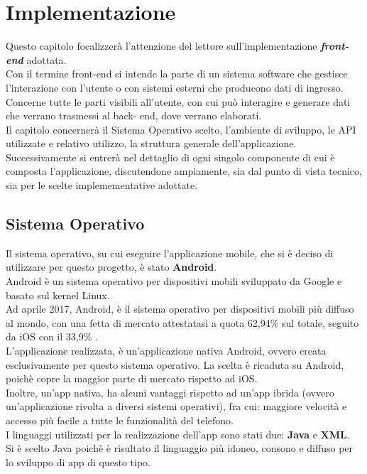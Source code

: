 \chapter{Implementazione}
\label{chapter2}

Questo capitolo focalizzerà l'attenzione del lettore sull'implementazione \textit{\textbf{front-end}} adottata.
\\Con il termine front-end si intende la parte di un sistema software che gestisce l’interazione con l’utente o con sistemi esterni che producono dati di ingresso. Concerne tutte le parti visibili all’utente, con cui può interagire e generare dati che verrano trasmessi al back- end, dove verrano elaborati.
\\Il capitolo concernerà il Sistema Operativo scelto, l'ambiente di sviluppo, le API utilizzate e relativo utilizzo, la struttura generale dell'applicazione.
\\Successivamente si entrerà nel dettaglio di ogni singolo componente di cui è composta l'applicazione, discutendone ampiamente, sia dal punto di vista tecnico, sia per le scelte implemementative adottate.

\section{Sistema Operativo}

Il sistema operativo, su cui eseguire l'applicazione mobile, che si è deciso di utilizzare per questo progetto, è stato \textbf{Android}.
\\Android è un sistema operativo per dispositivi mobili sviluppato da Google e basato sul kernel Linux.
\\Ad aprile 2017, Android, è il sistema operativo per dispositivi mobili più diffuso al mondo, con una fetta di mercato attestatasi a quota 62,94\% sul totale, seguito da iOS con il 33,9\% \cite{developers2011android}.
\\L'applicazione realizzata, è un'applicazione nativa Android, ovvero creata esclusivamente per questo sistema operativo. La scelta è ricaduta su Android, poichè copre la maggior parte di mercato rispetto ad iOS.
\\Inoltre, un'app nativa, ha alcuni vantaggi rispetto ad un'app ibrida (ovvero un'applicazione rivolta a diversi sistemi operativi), fra cui: maggiore velocità e accesso più facile a tutte le funzionalità del telefono.
\\I linguaggi utilizzati per la realizzazione dell'app sono stati due: \textbf{Java} e \textbf{XML}.
\\Si è scelto Java poichè è risultato il linguaggio più idoneo, consono e diffuso per lo sviluppo di app di questo tipo.

